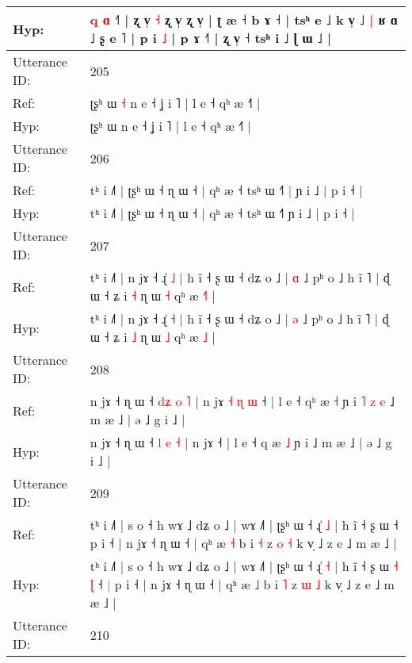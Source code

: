 \documentclass[10pt]{article}
\DeclareRobustCommand{\hl}[1]{{\textcolor{red}{#1}}}
\begin{document}
\begin{longtable}{ll}
 \\
Hyp: & \hl{}\hl{}\hl{}\hl{}\hl{q} \hl{}\hl{ɑ} ˧\hl{}\hl{}\hl{}\hl{}\hl{}\hl{}\hl{}\hl{}\hl{}\hl{}\hl{}\hl{}\hl{}\hl{}\hl{}\hl{}˥ | ʐ v̩\hl{}\hl{}\hl{}\hl{}\hl{}\hl{}\hl{}\hl{}\hl{} \hl{˧} ʐ v̩\hl{}\hl{}\hl{}\hl{}\hl{}\hl{}\hl{}\hl{}\hl{}\hl{}\hl{} ʐ v̩\hl{}\hl{}\hl{}\hl{}\hl{}\hl{}\hl{}\hl{}\hl{} | ʈ æ ˧ b ɤ ˧ | tsʰ e ˩ k v̩ ˩\hl{ }\hl{|} ʁ ɑ ˩ ʂ e ˥ | p i \hl{˩} | p\hl{}\hl{}\hl{}\hl{} \hl{}ɤ ˧˥ | ʐ v̩ ˧ tsʰ i ˩ ɭ ɯ ˩ |
 \\
\midrule
Utterance ID: & 205 \\
Ref: & ʈʂʰ ɯ\hl{ }\hl{˧} n e ˧ ʝ i ˥ | l e ˧ qʰ æ ˧˥ |
 \\
Hyp: & ʈʂʰ ɯ\hl{}\hl{} n e ˧ ʝ i ˥ | l e ˧ qʰ æ ˧˥ |
 \\
\midrule
Utterance ID: & 206 \\
Ref: & tʰ i ˩˥ | ʈʂʰ ɯ ˧ ɳ ɯ ˧ | qʰ æ ˧ tsʰ ɯ ˧˥\hl{ }\hl{|} ɲ i ˩ | p i ˧ |
 \\
Hyp: & tʰ i ˩˥ | ʈʂʰ ɯ ˧ ɳ ɯ ˧ | qʰ æ ˧ tsʰ ɯ ˧˥\hl{}\hl{} ɲ i ˩ | p i ˧ |
 \\
\midrule
Utterance ID: & 207 \\
Ref: & tʰ i ˩˥ | n jɤ ˧ ɻ̍ \hl{˩} | h ĩ ˧ ʂ ɯ ˧ dʑ o ˩ | \hl{ɑ} ˩ pʰ o ˩ h ĩ ˥ | ɖ ɯ ˧ ʑ i \hl{˧} ɳ ɯ \hl{˧} qʰ æ \hl{˧}\hl{˥} |
 \\
Hyp: & tʰ i ˩˥ | n jɤ ˧ ɻ̍ \hl{˧} | h ĩ ˧ ʂ ɯ ˧ dʑ o ˩ | \hl{ə} ˩ pʰ o ˩ h ĩ ˥ | ɖ ɯ ˧ ʑ i \hl{˩} ɳ ɯ \hl{˩} qʰ æ \hl{}\hl{˩} |
 \\
\midrule
Utterance ID: & 208 \\
Ref: & n jɤ ˧ ɳ ɯ ˧ \hl{d}\hl{ʑ} \hl{o} \hl{˥} | n jɤ\hl{ }\hl{˧}\hl{ }\hl{ɳ}\hl{ }\hl{ɯ} ˧ | l e ˧ q\hl{ʰ} æ \hl{˧} ɲ i\hl{ }\hl{˥}\hl{ }\hl{z}\hl{ }\hl{e} ˩ m æ ˩ | ə ˩ g i ˩ |
 \\
Hyp: & n jɤ ˧ ɳ ɯ ˧ \hl{}\hl{l} \hl{e} \hl{˧} | n jɤ\hl{}\hl{}\hl{}\hl{}\hl{}\hl{} ˧ | l e ˧ q\hl{} æ \hl{˩} ɲ i\hl{}\hl{}\hl{}\hl{}\hl{}\hl{} ˩ m æ ˩ | ə ˩ g i ˩ |
 \\
\midrule
Utterance ID: & 209 \\
Ref: & tʰ i ˩˥ | s o ˧ h wɤ ˩ dʑ o ˩ | wɤ ˩˥ | ʈʂʰ ɯ ˧ ɻ̍ \hl{˩} | h ĩ ˧ ʂ ɯ\hl{}\hl{}\hl{}\hl{} ˧\hl{}\hl{} p i ˧ | n jɤ ˧ ɳ ɯ ˧ | qʰ æ \hl{˧} b i \hl{˧} z \hl{o} \hl{˧} k v̩ ˩ z e ˩ m æ ˩ |
 \\
Hyp: & tʰ i ˩˥ | s o ˧ h wɤ ˩ dʑ o ˩ | wɤ ˩˥ | ʈʂʰ ɯ ˧ ɻ̍ \hl{˧} | h ĩ ˧ ʂ ɯ\hl{ }\hl{˧}\hl{ }\hl{ɭ} ˧\hl{ }\hl{|} p i ˧ | n jɤ ˧ ɳ ɯ ˧ | qʰ æ \hl{˩} b i \hl{˥} z \hl{ɯ} \hl{˩} k v̩ ˩ z e ˩ m æ ˩ |
 \\
\midrule
Utterance ID: & 210 \\

\end{longtable}
\end{document}
